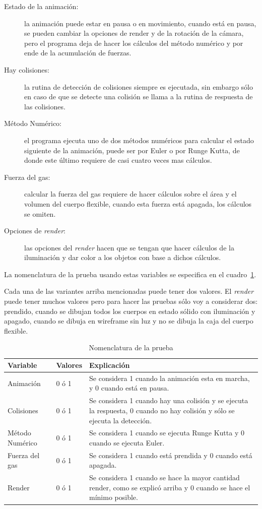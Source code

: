 \begin{description}
 \item[Estado de la animación:]la animación puede estar en pausa o en movimiento, cuando está en pausa, se pueden cambiar la opciones de render y de la rotación de la cámara, pero el programa deja de hacer los cálculos del método numérico y por ende de la acumulación de fuerzas.
 \item[Hay colisiones:]la rutina de detección de colisiones siempre es ejecutada, sin embargo sólo en caso de que se detecte una colisión se llama a la rutina de respuesta de las colisiones.
 \item[Método Numérico:]el programa ejecuta uno de dos métodos numéricos para calcular el estado siguiente de la animación, puede ser por Euler o por Runge Kutta, de donde este último requiere de casi cuatro veces mas cálculos.
 \item[Fuerza del gas:]calcular la fuerza del gas requiere de hacer cálculos sobre el área y el volumen del cuerpo flexible, cuando esta fuerza está apagada, los cálculos se omiten.
 \item[Opciones de \emph{\textenglish{render}}:]las opciones del \emph{\textenglish{render}} hacen que se tengan que hacer cálculos de la iluminación y dar color a los objetos con base a dichos cálculos.
\end{description}

La nomenclatura de la prueba usando estas variables se especifica en el cuadro~\ref{nomenclatura:prueba}.

Cada una de las variantes arriba mencionadas puede tener dos valores.
El \emph{\textenglish{render}} puede tener muchos valores pero para hacer las pruebas sólo voy a considerar dos: prendido, cuando se dibujan todos los cuerpos en estado sólido con iluminación y apagado, cuando se dibuja en wireframe sin luz y no se dibuja la caja del cuerpo flexible.

\begin{table}
\begin{center}
\begin{tabular} {@{}llp{10cm}@{}}
\toprule
 Variable & Valores & Explicación\\
\midrule 
 Animación & 0 ó 1 & Se considera 1 cuando la animación esta en marcha, y 0 cuando está en pausa. \\
 Colisiones & 0 ó 1 & Se considera 1 cuando hay una colisión y se ejecuta la respuesta, 0 cuando no hay colisión y sólo se ejecuta la detección. \\
 Método Numérico & 0 ó 1 & Se considera 1 cuando se ejecuta Runge Kutta y 0 cuando se ejecuta Euler. \\
 Fuerza del gas & 0 ó 1 & Se considera 1 cuando está prendida y 0 cuando está apagada. \\
 Render & 0 ó 1 & Se considera 1 cuando se hace la mayor cantidad render, como se explicó arriba y 0 cuando se hace el mínimo posible. \\
\bottomrule
\end{tabular}
\end{center}
\caption[Explicación de la nomenclatura de la prueba del programa]{Nomenclatura de la prueba}
\label{nomenclatura:prueba}
\end{table}

